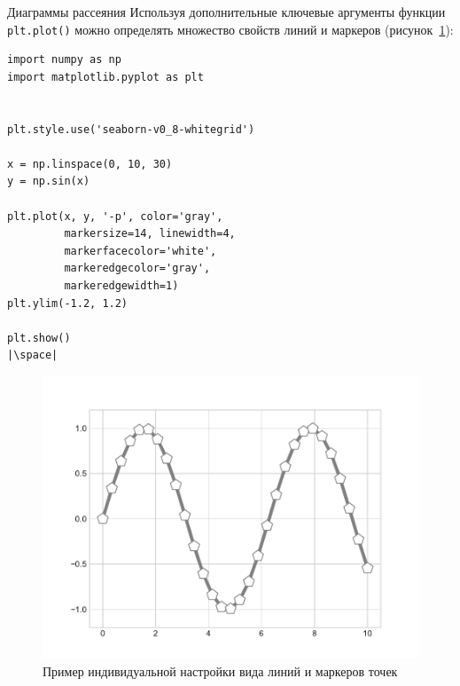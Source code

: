 \documentclass[aspectratio=169, mathserif]{beamer}	%
\begin{document}
\begin{frame}[fragile, label=m]{Диаграммы рассеяния}
\scriptsize
Используя дополнительные ключевые аргументы функции \texttt{plt.plot()} можно определять множество свойств линий и маркеров (рисунок~\ref{fig:fig_16}):
\vfill
\begin{minipage}{.4\textwidth}
\begin{verbatim}
import numpy as np
import matplotlib.pyplot as plt


plt.style.use('seaborn-v0_8-whitegrid')

x = np.linspace(0, 10, 30)
y = np.sin(x)

plt.plot(x, y, '-p', color='gray',
         markersize=14, linewidth=4,
         markerfacecolor='white',
         markeredgecolor='gray',
         markeredgewidth=1)
plt.ylim(-1.2, 1.2)

plt.show()
|\space|
\end{verbatim}
\end{minipage}
\begin{minipage}{.59\textwidth}
\begin{figure}[h!]
	\centering
	\includegraphics[width=.85\linewidth]{./pics/Figure_16}
	\caption{Пример индивидуальной настройки вида линий и маркеров точек}
	\label{fig:fig_16}
\end{figure}
\end{minipage}
\vfill
\end{frame}
\end{document}
